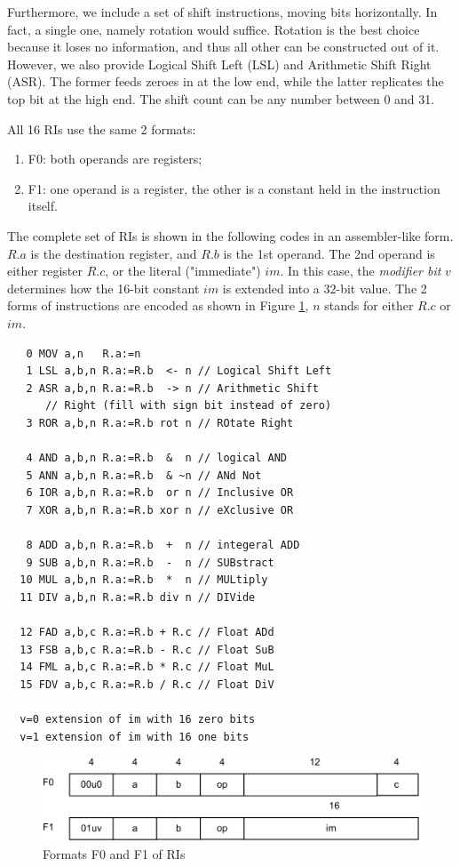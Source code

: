 Furthermore, we include a set of shift instructions, moving bits horizontally. In fact, a single one,
namely rotation would suffice. Rotation is the best choice because it loses no information, and thus
all other can be constructed out of it. However, we also provide Logical Shift Left (LSL) and
Arithmetic Shift Right (ASR). The former feeds zeroes in at the low end, while the latter replicates
the top bit at the high end. The shift count can be any number between 0 and 31.

All 16 RIs use the same 2 formats:
\begin{enumerate}
  \item F0: both operands are registers;
  \item F1: one operand is a register, the other is a constant held in the instruction itself.
\end{enumerate}

The complete set of RIs is shown in the following codes in an assembler-like form. $R.a$ is
the destination register, and $R.b$ is the 1st operand. The 2nd operand is either register
$R.c$, or the literal ("immediate") $im$. In this case, the \emph{modifier bit} $v$ determines
how the 16-bit constant $im$ is extended into a 32-bit value. The 2 forms of instructions are
encoded as shown in Figure \ref{fig:ri}, $n$ stands for either $R.c$ or $im$.
\begin{verbatim}
   0 MOV a,n   R.a:=n
   1 LSL a,b,n R.a:=R.b  <- n // Logical Shift Left
   2 ASR a,b,n R.a:=R.b  -> n // Arithmetic Shift
      // Right (fill with sign bit instead of zero)
   3 ROR a,b,n R.a:=R.b rot n // ROtate Right

   4 AND a,b,n R.a:=R.b  &  n // logical AND
   5 ANN a,b,n R.a:=R.b  & ~n // ANd Not
   6 IOR a,b,n R.a:=R.b  or n // Inclusive OR
   7 XOR a,b,n R.a:=R.b xor n // eXclusive OR

   8 ADD a,b,n R.a:=R.b  +  n // integeral ADD
   9 SUB a,b,n R.a:=R.b  -  n // SUBstract
  10 MUL a,b,n R.a:=R.b  *  n // MULtiply
  11 DIV a,b,n R.a:=R.b div n // DIVide

  12 FAD a,b,c R.a:=R.b + R.c // Float ADd
  13 FSB a,b,c R.a:=R.b - R.c // Float SuB
  14 FML a,b,c R.a:=R.b * R.c // Float MuL
  15 FDV a,b,c R.a:=R.b / R.c // Float DiV

  v=0 extension of im with 16 zero bits
  v=1 extension of im with 16 one bits
\end{verbatim}
\begin{figure}[h!]
  \centering
  \includegraphics[width=.9\textwidth]{i/2.png}
  \caption{Formats F0 and F1 of RIs}
  \label{fig:ri}
\end{figure}

